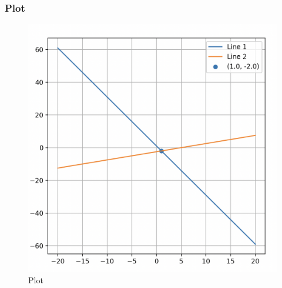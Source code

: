 \documentclass{beamer}
\begin{document}
\begin{frame}[fragile]
\frametitle{Plot}

\begin{figure}[H]
    \centering
    \includegraphics[width=0.6\columnwidth]{Figs/5338.png}
    \caption{Plot}
    \label{fig:placeholder}
\end{figure}

\end{frame}
\end{document}
